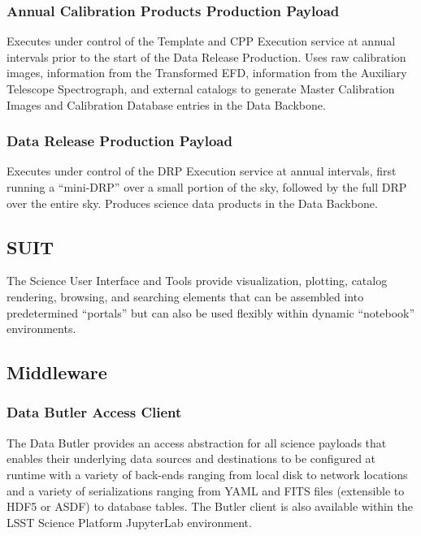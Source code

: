 \documentclass[DM,lsstdraft,toc]{lsstdoc}
\begin{document}
\subsubsection{Annual Calibration Products Production
Payload}\label{annual-calibration-products-production-payload}

Executes under control of the Template and CPP Execution service at
annual intervals prior to the start of the Data Release Production. Uses
raw calibration images, information from the Transformed EFD,
information from the Auxiliary Telescope Spectrograph, and external
catalogs to generate Master Calibration Images and Calibration Database
entries in the Data Backbone.

\subsubsection{Data Release Production
Payload}\label{data-release-production-payload}

Executes under control of the DRP Execution service at annual intervals,
first running a ``mini-DRP'' over a small portion of the sky, followed
by the full DRP over the entire sky. Produces science data products in
the Data Backbone.

\subsection{SUIT}\label{suit}

The Science User Interface and Tools provide visualization, plotting,
catalog rendering, browsing, and searching elements that can be
assembled into predetermined ``portals'' but can also be used flexibly
within dynamic ``notebook'' environments.

\subsection{Middleware}\label{middleware}

\subsubsection{Data Butler Access
Client}\label{data-butler-access-client}

The Data Butler provides an access abstraction for all science payloads
that enables their underlying data sources and destinations to be
configured at runtime with a variety of back-ends ranging from local
disk to network locations and a variety of serializations ranging from
YAML and FITS files (extensible to HDF5 or ASDF) to database tables. The
Butler client is also available within the LSST Science Platform
JupyterLab environment.
\end{document}
